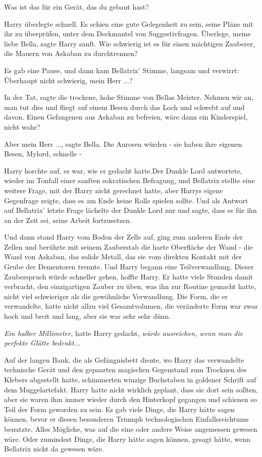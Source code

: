 \glqq{}Was ist das für ein Gerät, das du gebaut hast?\grqq{}

Harry überlegte schnell. Es schien eine gute Gelegenheit zu sein, seine Pläne
mit ihr zu überprüfen, unter dem Deckmantel von Suggestivfragen. \glqq{}Überlege,
meine liebe Bella\grqq{}, sagte Harry sanft. \glqq{}Wie schwierig ist es für
einen mächtigen Zauberer, die Mauern von Askaban zu durchtrennen?\grqq{}

Es gab eine Pause, und dann kam Bellatrix' Stimme, langsam und verwirrt: \glqq{}
Überhaupt nicht schwierig, mein Herr ...?\grqq{}

\glqq{}In der Tat\grqq{}, sagte die trockene, hohe Stimme von Bellas Meister.
\glqq{}Nehmen wir an, man tut dies und fliegt auf einem Besen durch das Loch und
schwebt auf und davon. Einen Gefangenen aus Askaban zu befreien, wäre dann ein
Kinderspiel, nicht wahr?\grqq{}

\glqq{}Aber mein Herr ...\grqq{}, sagte Bella. \glqq{}Die Auroren würden - sie
haben ihre eigenen Besen, Mylord, schnelle -\grqq{}

Harry horchte auf, es war, wie er gedacht hatte.Der Dunkle Lord antwortete,
wieder im Tonfall einer sanften sokratischen Befragung, und Bellatrix stellte
eine weitere Frage, mit der Harry nicht gerechnet hatte, aber Harrys eigene
Gegenfrage zeigte, dass es am Ende keine Rolle spielen sollte. Und als Antwort
auf Bellatrix' letzte Frage lächelte der Dunkle Lord nur und sagte, dass es für
ihn an der Zeit sei, seine Arbeit fortzusetzen.

Und dann stand Harry vom Boden der Zelle auf, ging zum anderen Ende der Zellen
und berührte mit seinem Zauberstab die harte Oberfläche der Wand - die Wand von
Askaban, das solide Metall, das sie vom direkten Kontakt mit der Grube der
Dementoren trennte. Und Harry begann eine Teilverwandlung. Dieser Zauberspruch
würde schneller gehen, hoffte Harry. Er hatte viele Stunden damit verbracht, den
einzigartigen Zauber zu üben, was ihn zur Routine gemacht hatte, nicht viel
schwieriger als die gewöhnliche Verwandlung. Die Form, die er verwandelte, hatte
nicht allzu viel Gesamtvolumen, die veränderte Form war zwar hoch und breit und
lang, aber sie war sehr sehr dünn.

\emph{Ein halber Millimeter,} hatte Harry gedacht, \emph{würde ausreichen, wenn
man die perfekte Glätte bedenkt...}

Auf der langen Bank, die als Gefängnisbett diente, wo Harry das verwandelte
technische Gerät und den gepaarten magischen Gegenstand zum Trocknen des Klebers
abgestellt hatte, schimmerten winzige Buchstaben in goldener Schrift auf dem
Muggelartefakt. Harry hatte nicht wirklich geplant, dass sie dort sein sollten,
aber sie waren ihm immer wieder durch den Hinterkopf gegangen und schienen so
Teil der Form geworden zu sein. Es gab viele Dinge, die Harry hätte sagen
können, bevor er diesen besonderen Triumph technologischen Einfallsreichtums
benutzte. Alles Mögliche, was auf die eine oder andere Weise angemessen gewesen
wäre. Oder zumindest Dinge, die Harry hätte sagen können, gesagt hätte, wenn
Bellatrix nicht da gewesen wäre.

